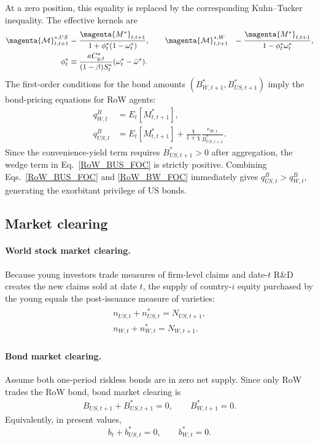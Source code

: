 \documentclass{article}
\def\green#1{#1}%
\begin{document}
\green{At a zero position}, \green{this equality is replaced by the corresponding Kuhn--Tucker inequality}.
\green{The effective kernels are}
\begin{align*}
\magenta{\mathcal M}^{*,US}_{t,t+1}&=\frac{\magenta{M^*}_{t,t+1}}{1+\phi_t^*(1-\omega_t^*)},
\qquad
\magenta{\mathcal M}^{*,W}_{t,t+1}&=\frac{\magenta{M^*}_{t,t+1}}{1-\phi_t^*\omega_t^*},\\
\phi_t^*
&\equiv \frac{\kappa C^*_{y,t}}{(1-\beta)S_t^*}(\omega_t^*-\bar\omega^*).
\end{align*}
The first-order conditions for the bond amounts $(B_{W,t+1}^*,B_{US,t+1}^*)$ imply the bond-pricing equations for RoW agents:
\begin{align}
q^B_{W,t}&=E_t\!\left[M^*_{t,t+1}\right], \label{RoW_BW_FOC}\\
q^B_{US,t}&=E_t\!\left[M^*_{t,t+1}\right]
+\frac{\chi}{1+\chi} \frac{e_{W,t}}{B^*_{US,t+1}}. \label{RoW_BUS_FOC}
\end{align}
Since the convenience-yield term requires $B^*_{US,t+1}>0$ after aggregation, the wedge term in Eq.~\eqref{RoW_BUS_FOC} is strictly positive. Combining Eqs.~\eqref{RoW_BUS_FOC} and \eqref{RoW_BW_FOC} immediately gives $q^B_{US,t}>q^B_{W,t}$, generating the exorbitant privilege of US bonds.

\subsection{Market clearing}

\paragraph{World stock market clearing.}
Because young investors trade measures of firm-level claims and date-$t$ R\&D creates the new claims sold at date $t$, the supply of country-$i$ equity purchased by the young equals the post-issuance measure of varieties:
\begin{align}\label{stock_clear_mod}
\begin{split}
n_{US,t}+n^*_{US,t}=N_{US,t+1},\\
n_{W,t}+n^*_{W,t}=N_{W,t+1}.
\end{split}
\end{align}

\paragraph{Bond market clearing.}
Assume both one-period riskless bonds are in zero net supply. Since only RoW trades the RoW bond, bond market clearing is
\begin{align}\label{bond_clear_mod_zerosupply}
B_{US,t+1}+B^*_{US,t+1}=0,
\qquad
B^*_{W,t+1}=0.
\end{align}
Equivalently, in present values,
\[
b_t+b_{US,t}^*=0,
\qquad
b_{W,t}^*=0.
\]
\end{document}
